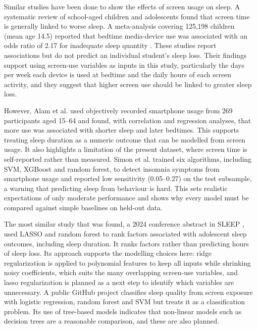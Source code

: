 \documentclass[11pt]{article}
\begin{document}
Similar studies have been done to show the effects of screen usage on sleep. A systematic review of school-aged children and adolescents \citep{hale2015} found that screen time is generally linked to worse sleep. A meta-analysis covering 125,198 children (mean age 14.5) reported that bedtime media-device use was associated with an odds ratio of 2.17 for inadequate sleep quantity \citep{carter2016}. These studies report associations but do not predict an individual student’s sleep loss. Their findings support using screen-use variables as inputs in this study, particularly the days per week each device is used at bedtime and the daily hours of each screen activity, and they suggest that higher screen use should be linked to greater sleep loss.

However, Alam et al. \citet{alam2023} used objectively recorded smartphone usage from 269 participants aged 15–64 and found, with correlation and regression analyses, that more use was associated with shorter sleep and later bedtimes. This supports treating sleep duration as a numeric outcome that can be modelled from screen usage. It also highlights a limitation of the present dataset, where screen time is self-reported rather than measured. Simon et al. \citet{simon2024} trained six algorithms, including SVM, XGBoost and random forest, to detect insomnia symptoms from smartphone usage and reported low sensitivity (0.05–0.27) on the test subsample, a warning that predicting sleep from behaviour is hard. This sets realistic expectations of only moderate performance and shows why every model must be compared against simple baselines on held-out data.

The most similar study that was found, a 2024 conference abstract in SLEEP \citep{sleep2024abstract}, used LASSO and random forest to rank factors associated with adolescent sleep outcomes, including sleep duration. It ranks factors rather than predicting hours of sleep loss. Its approach supports the modelling choices here: ridge regularization is applied to polynomial features to keep all inputs while shrinking noisy coefficients, which suits the many overlapping screen-use variables, and lasso regularization is planned as a next step to identify which variables are unnecessary. A public GitHub project \citep{som2024} classifies sleep quality from screen exposure with logistic regression, random forest and SVM but treats it as a classification problem. Its use of tree-based models indicates that non-linear models such as decision trees are a reasonable comparison, and these are also planned.
\end{document}
